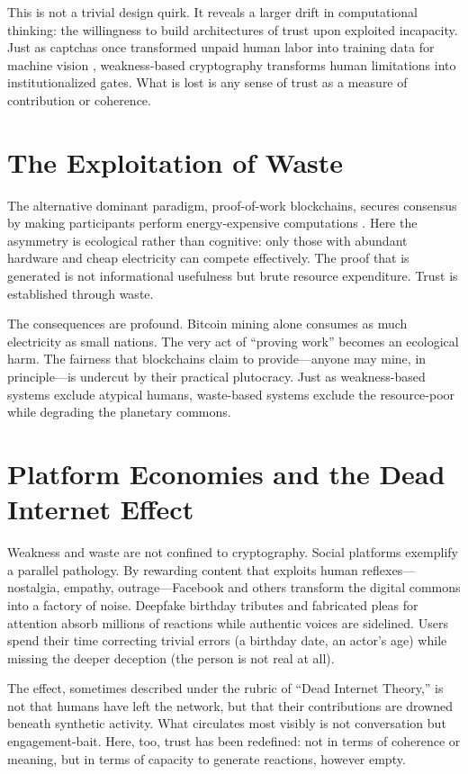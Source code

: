 \documentclass{book}
\begin{document}
This is not a trivial design quirk. It reveals a larger drift in computational thinking: the willingness to build architectures of trust upon exploited incapacity. Just as captchas once transformed unpaid human labor into training data for machine vision \cite{vonahn2003}, weakness-based cryptography transforms human limitations into institutionalized gates. What is lost is any sense of trust as a measure of contribution or coherence.

\section{The Exploitation of Waste}

The alternative dominant paradigm, proof-of-work blockchains, secures consensus by making participants perform energy-expensive computations \cite{nakamoto2008}. Here the asymmetry is ecological rather than cognitive: only those with abundant hardware and cheap electricity can compete effectively. The proof that is generated is not informational usefulness but brute resource expenditure. Trust is established through waste.

The consequences are profound. Bitcoin mining alone consumes as much electricity as small nations. The very act of “proving work” becomes an ecological harm. The fairness that blockchains claim to provide—anyone may mine, in principle—is undercut by their practical plutocracy. Just as weakness-based systems exclude atypical humans, waste-based systems exclude the resource-poor while degrading the planetary commons.

\section{Platform Economies and the Dead Internet Effect}

Weakness and waste are not confined to cryptography. Social platforms exemplify a parallel pathology. By rewarding content that exploits human reflexes—nostalgia, empathy, outrage—Facebook and others transform the digital commons into a factory of noise. Deepfake birthday tributes and fabricated pleas for attention absorb millions of reactions while authentic voices are sidelined. Users spend their time correcting trivial errors (a birthday date, an actor’s age) while missing the deeper deception (the person is not real at all).

The effect, sometimes described under the rubric of “Dead Internet Theory,” is not that humans have left the network, but that their contributions are drowned beneath synthetic activity. What circulates most visibly is not conversation but engagement-bait. Here, too, trust has been redefined: not in terms of coherence or meaning, but in terms of capacity to generate reactions, however empty.
\end{document}
